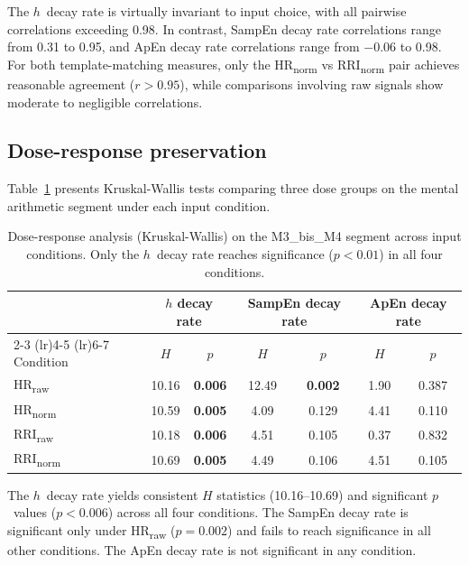 \documentclass[12pt,a4paper]{article}
\begin{document}
The $h$~decay rate is virtually invariant to input choice, with all pairwise correlations exceeding 0.98.
In contrast, SampEn decay rate correlations range from 0.31 to 0.95, and ApEn decay rate correlations range from $-0.06$ to 0.98.
For both template-matching measures, only the HR\textsubscript{norm} vs RRI\textsubscript{norm} pair achieves reasonable agreement ($r > 0.95$), while comparisons involving raw signals show moderate to negligible correlations.

\subsection{Dose-response preservation}\label{sec:kw}

Table~\ref{tab:kw} presents Kruskal-Wallis tests comparing three dose groups on the mental arithmetic segment under each input condition.

\begin{table}[htbp]
\centering
\caption{Dose-response analysis (Kruskal-Wallis) on the M3\_bis\_M4 segment across input conditions.
Only the $h$~decay rate reaches significance ($p < 0.01$) in all four conditions.}\label{tab:kw}
\small
\begin{tabular}{l cc cc cc}
\toprule
& \multicolumn{2}{c}{$h$ decay rate} & \multicolumn{2}{c}{SampEn decay rate} & \multicolumn{2}{c}{ApEn decay rate} \\
\cmidrule(lr){2-3} \cmidrule(lr){4-5} \cmidrule(lr){6-7}
Condition & $H$ & $p$ & $H$ & $p$ & $H$ & $p$ \\
\midrule
HR\textsubscript{raw}  & 10.16 & \textbf{0.006} & 12.49 & \textbf{0.002} & 1.90 & 0.387 \\
HR\textsubscript{norm} & 10.59 & \textbf{0.005} & 4.09  & 0.129           & 4.41 & 0.110 \\
RRI\textsubscript{raw} & 10.18 & \textbf{0.006} & 4.51  & 0.105           & 0.37 & 0.832 \\
RRI\textsubscript{norm}& 10.69 & \textbf{0.005} & 4.49  & 0.106           & 4.51 & 0.105 \\
\bottomrule
\end{tabular}
\end{table}

The $h$~decay rate yields consistent $H$ statistics (10.16--10.69) and significant $p$~values ($p < 0.006$) across all four conditions.
The SampEn decay rate is significant only under HR\textsubscript{raw} ($p = 0.002$) and fails to reach significance in all other conditions.
The ApEn decay rate is not significant in any condition.
\end{document}
